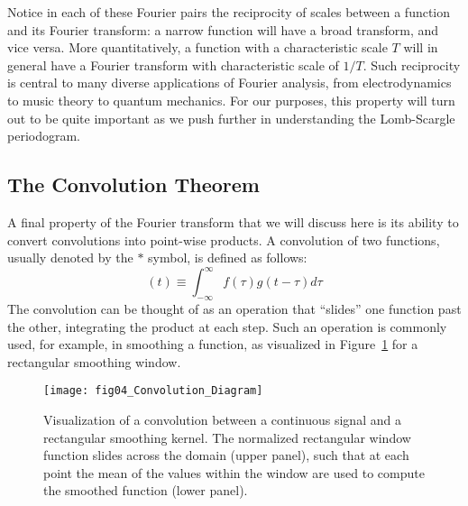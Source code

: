 \documentclass[preprint]{aastex}
\newcommand{\Fig}[1]{Figure~\ref{fig:#1}}
\newcommand{\figlabel}[1]{\label{fig:#1}}
\newcommand{\eqlabel}[1]{\label{eq:#1}}
\begin{document}
Notice in each of these Fourier pairs the reciprocity
of scales between a function and its Fourier transform:
a narrow function will have a broad transform, and vice versa.
More quantitatively, a function with a characteristic scale $T$ will in
general have a Fourier transform with characteristic scale of $1/T$.
Such reciprocity is central to many diverse applications of Fourier analysis,
from electrodynamics to music theory to quantum mechanics.
For our purposes, this property will turn out to be quite
important as we push further in understanding the Lomb-Scargle periodogram.


\subsection{The Convolution Theorem}

A final property of the Fourier transform that we will discuss here is its
ability to convert convolutions into point-wise products.
A convolution of two functions, usually denoted by the $\ast$ symbol,
is defined as follows:
\begin{equation}
  [f \ast g](t) \equiv \int_{-\infty}^\infty f(\tau)g(t - \tau) d\tau
  \eqlabel{convolution-definition}
\end{equation}
The convolution can be thought of as an operation that ``slides'' one
function past the other, integrating the product at each step.
Such an operation is commonly used, for example, in smoothing a function,
as visualized in \Fig{convolution} for a rectangular smoothing window.

\begin{figure}[ht]
  \centering
  \texttt{[image: fig04\_Convolution\_Diagram]}
  \caption{Visualization of a convolution between a continuous signal and a rectangular smoothing kernel.
    The normalized rectangular window function slides across the domain (upper panel),
    such that at each point the mean of the values within the window are
    used to compute the smoothed function (lower panel).
    \figlabel{convolution}}
\end{figure}
\end{document}
